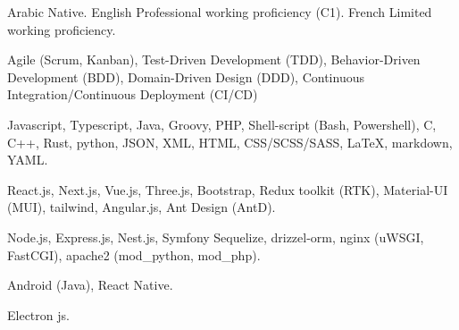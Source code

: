 

\begin{cvskills}
  \cvskill
    {Arabic}
    {Native.}
  \cvskill
    {English}
    {Professional working proficiency (C1).}
  \cvskill
    {French}
    {Limited working proficiency.}
\end{cvskills}


\begin{cvparagraph}
  Agile (Scrum, Kanban),
  Test-Driven Development (TDD),
  Behavior-Driven Development (BDD),
  Domain-Driven Design (DDD),
  Continuous Integration/Continuous Deployment (CI/CD)
\end{cvparagraph}


\begin{cvparagraph}
  Javascript,
  Typescript,
  Java,
  Groovy,
  PHP,
  Shell-script (Bash, Powershell),
  C,
  C++,
  Rust,
  python,
  JSON,
  XML,
  HTML,
  CSS/SCSS/SASS,
  LaTeX,
  markdown,
  YAML.
\end{cvparagraph}


\begin{cvparagraph}
  React.js,
  Next.js,
  Vue.js,
  Three.js,
  Bootstrap,
  Redux toolkit (RTK),
  Material-UI (MUI),
  tailwind,
  Angular.js,
  Ant Design (AntD).
\end{cvparagraph}


\begin{cvparagraph}
  Node.js,
  Express.js,
  Nest.js,
  Symfony
  Sequelize,
  drizzel-orm,
  nginx (uWSGI, FastCGI),
  apache2 (mod\_python, mod\_php).
\end{cvparagraph}


\begin{cvparagraph}
  Android (Java),
  React Native.
\end{cvparagraph}


\begin{cvparagraph}
  Electron js.
\end{cvparagraph}

